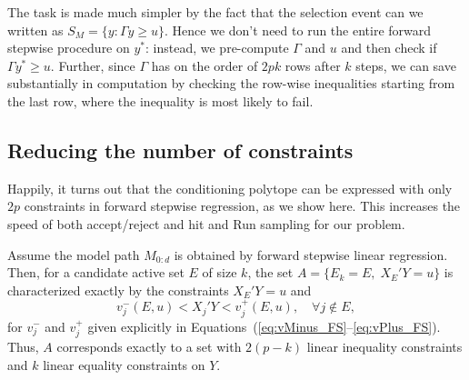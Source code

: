 \documentclass{article}
\begin{document}
The task is made much simpler by the fact that the selection event can we written as $S_M=\{y: \Gamma y \geq u\}$.
Hence we don't need to run the entire forward stepwise procedure on $y^*$: instead, we pre-compute $\Gamma$ and $u$ and then check
if $\Gamma y^* \geq u$. Further, since $\Gamma$ has on the  order of $2pk$ rows after $k$ steps,  we can save 
substantially in computation by checking the row-wise inequalities starting from the last row, where the inequality is most likely to fail.

\subsection{Reducing the number of constraints}
Happily, it turns out that the conditioning polytope can be expressed with only $2p$ constraints in forward stepwise regression, as we show here.
This increases the speed of both accept/reject and hit and Run sampling for our problem.

\begin{theorem}
  Assume the model path $M_{0:d}$ is obtained by forward stepwise 
  linear regression. Then, for a candidate active set $E$ of size $k$, 
  the set $A = \{E_k = E, \;X_E'Y = u\}$ is characterized 
  exactly by the constraints $X_E'Y=u$ and
  \[
  v_j^-(E,u) < X_j'Y < v_j^+(E,u), \quad\forall j \notin E,
  \]
  for $v_j^-$ and $v_j^+$ given explicitly in
  Equations~(\ref{eq:vMinus_FS}--\ref{eq:vPlus_FS}).
  Thus, $A$ corresponds exactly to 
  a set with $2(p-k)$ linear inequality constraints and $k$
  linear equality constraints on $Y$.
\end{theorem}
\end{document}
